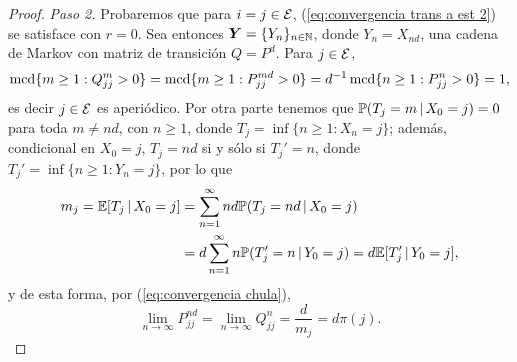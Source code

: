 \begin{proof}
    \emph{Paso 2.} Probaremos que para $i = j \in \mathcal{E}$, (\ref{eq:convergencia trans a est 2}) se satisface con $r = 0$. Sea entonces $\bm Y = \{Y_n\}_{n \in \mathbb{N}}$, donde $Y_n = X_{nd}$, una cadena de Markov con matriz de transición $Q = P^d$. Para $j \in \mathcal{E}$, 
    \begin{align*}
        \operatorname{mcd} \{m \geq 1 : Q_{jj}^m > 0\} = \operatorname{mcd} \{m \geq 1 : P_{jj}^{md} > 0\} = d^{-1} \operatorname{mcd}\{n \geq 1 : P_{jj}^n > 0\} = 1,
    \end{align*}
    es decir $j \in \mathcal{E}$ es aperiódico. Por otra parte tenemos que $\mathbb{P}(T_j = m \,\vert\, X_0 = j) = 0$ para toda $m \neq nd$, con $n \geq 1$, donde $T_j = \inf\{n \geq 1 : X_n = j\}$; además, condicional en $X_0 = j$, $T_j = nd$ si y sólo si $T_j' = n$, donde $T_j' = \inf\{n \geq 1 : Y_n = j\}$, por lo que 
    \begin{align*}
        m_j = \mathbb{E}[T_j \,\vert\, X_0 = j] & = \sum_{n = 1}^\infty nd \mathbb{P}(T_j = nd \,\vert\, X_0 = j) \\
        & = d \sum_{n = 1}^\infty n \mathbb{P}(T_j' = n \,\vert\, Y_0 = j) = d\mathbb{E}[T_j' \,\vert\, Y_0 = j],
    \end{align*}
    y de esta forma, por (\ref{eq:convergencia chula}),
    \[
        \lim_{n \to \infty} P_{jj}^{nd} = \lim_{n \to \infty} Q_{jj}^n = \frac{d}{m_j} = d\pi(j).
    \]


\end{proof}
